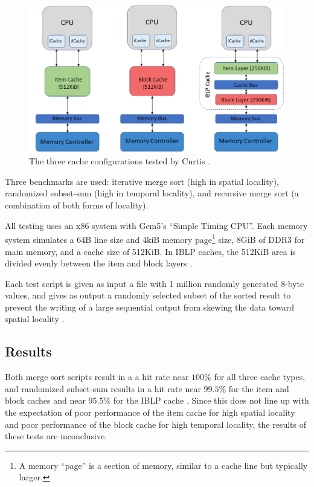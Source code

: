 \documentclass[12pt,twoside]{reedthesis}
\begin{document}
	\begin{figure}[h]
		\centering
		\includegraphics[width=5in]{figures/curtis_caches.png}
		\caption{The three cache configurations tested by Curtis \cite{curtis}.}
	\end{figure}

	Three benchmarks are used: iterative merge sort (high in spatial locality), randomized subset-sum (high in temporal locality), and recursive merge sort (a combination of both forms of locality).
	
	All testing uses an x86 system with Gem5's ``Simple Timing CPU''. Each memory system simulates a 64B line size and 4kiB memory page\footnote{A memory ``page'' is a section of memory, similar to a cache line but typically larger.} size, 8GiB of DDR3 for main memory, and a cache size of 512KiB. In IBLP caches, the 512KiB area is divided evenly between the item and block layers \cite{curtis}.

	Each test script is given as input a file with 1 million randomly generated 8-byte values, and gives as output a randomly selected subset of the sorted result to prevent the writing of a large sequential output from skewing the data toward spatial locality \cite{curtis}.

	\subsection*{Results}

	Both merge sort scripts result in a a hit rate near $100\%$ for all three cache types, and randomized subset-sum results in a hit rate near $99.5\%$ for the item and block caches and near $95.5\%$ for the IBLP cache \cite{curtis}. Since this does not line up with the expectation of poor performance of the item cache for high spatial locality and poor performance of the block cache for high temporal locality, the results of these tests are inconclusive.
\end{document}

